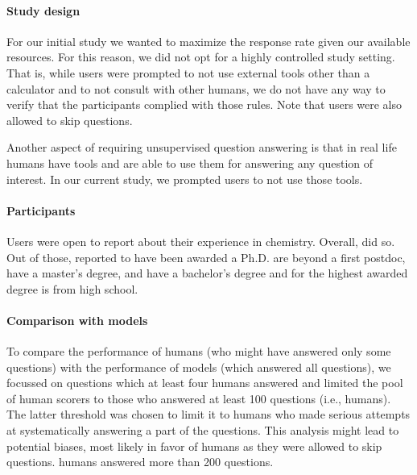 \documentclass[11pt, oneside]{article}
\begin{document}
\begin{refsection}
\paragraph{Study design}
For our initial study we wanted to maximize the response rate given our available resources. 
For this reason, we did not opt for a highly controlled study setting. 
That is, while users were prompted to not use external tools other than a calculator and to not consult with other humans, we do not have any way to verify that the participants complied with those rules. 
Note that users were also allowed to skip questions.

Another aspect of requiring unsupervised question answering is that in real life humans have tools and are able to use them for answering any question of interest. 
In our current study, we prompted users to not use those tools.

\paragraph{Participants}
Users were open to report about their experience in chemistry. 
Overall,  did so. 
Out of those,  reported to have been awarded a Ph.D.
 are beyond a first postdoc,  have a master's degree, and  have a bachelor's degree and for  the highest awarded degree is from high school.


\paragraph{Comparison with models}
To compare the performance of humans (who might have answered only some questions) with the performance of models (which answered all questions), we focussed on questions which at least four humans answered and limited the pool of human scorers to those who answered at least 100 questions (i.e.,  humans). 
The latter threshold was chosen to limit it to humans who made serious attempts at systematically answering a part of the questions. 
This analysis might lead to potential biases, most likely in favor of humans as they were allowed to skip questions.  humans answered more than 200 questions.



\end{refsection}
\end{document}
